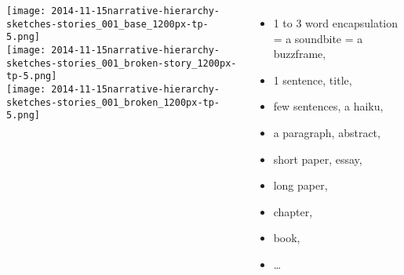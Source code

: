 \begin{frame}

  \begin{block}{}
    \begin{columns}
      \texttt{[image: 2014-11-15narrative-hierarchy-sketches-stories\_001\_base\_1200px-tp-5.png]}\\
      \texttt{[image: 2014-11-15narrative-hierarchy-sketches-stories\_001\_broken-story\_1200px-tp-5.png]}\\
      \texttt{[image: 2014-11-15narrative-hierarchy-sketches-stories\_001\_broken\_1200px-tp-5.png]}
      \begin{itemize}
      \item 
        1 to 3 word encapsulation = a soundbite = a buzzframe,
      \item 
        1 sentence, title,
      \item 
        few sentences, a haiku,
      \item 
        a paragraph, abstract,
      \item 
        short paper, essay,
      \item 
        long paper,
      \item 
        chapter,
      \item 
        book,
      \item 
        \ldots
      \end{itemize}
    \end{columns}

  \end{block}

\end{frame}




